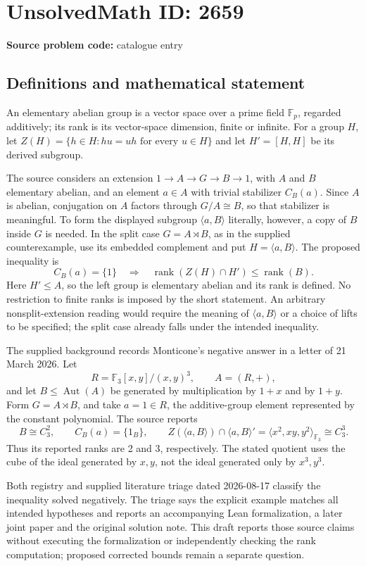 \documentclass[11pt]{article}
\newcommand{\F}{\mathbb{F}}
\begin{document}
\section*{UnsolvedMath ID: 2659}
\textbf{Source problem code:} catalogue entry
\subsection{Definitions and mathematical statement}
An elementary abelian group is a vector space over a prime field \(\F_p\), regarded additively; its rank is its vector-space dimension, finite or infinite. For a group \(H\), let \(Z(H)=\{h\in H:hu=uh\text{ for every }u\in H\}\) and let \(H'=[H,H]\) be its derived subgroup.

The source considers an extension \(1\to A\to G\to B\to1\), with \(A\) and \(B\) elementary abelian, and an element \(a\in A\) with trivial stabilizer \(C_B(a)\). Since \(A\) is abelian, conjugation on \(A\) factors through \(G/A\cong B\), so that stabilizer is meaningful. To form the displayed subgroup \(\langle a,B\rangle\) literally, however, a copy of \(B\) inside \(G\) is needed. In the split case \(G=A\rtimes B\), as in the supplied counterexample, use its embedded complement and put \(H=\langle a,B\rangle\). The proposed inequality is
\[
C_B(a)=\{1\}\quad\Longrightarrow\quad
\operatorname{rank}(Z(H)\cap H')\leq\operatorname{rank}(B).
\]
Here \(H'\leq A\), so the left group is elementary abelian and its rank is defined. No restriction to finite ranks is imposed by the short statement. An arbitrary nonsplit-extension reading would require the meaning of \(\langle a,B\rangle\) or a choice of lifts to be specified; the split case already falls under the intended inequality.

The supplied background records Monticone's negative answer in a letter of 21 March 2026. Let
\[
R=\F_3[x,y]/(x,y)^3,\qquad A=(R,+),
\]
and let \(B\leq\operatorname{Aut}(A)\) be generated by multiplication by \(1+x\) and by \(1+y\). Form \(G=A\rtimes B\), and take \(a=1\in R\), the additive-group element represented by the constant polynomial. The source reports
\[
B\cong C_3^2,\qquad C_B(a)=\{1_B\},\qquad
Z(\langle a,B\rangle)\cap\langle a,B\rangle'
=\langle x^2,xy,y^2\rangle_{\F_3}\cong C_3^3.
\]
Thus its reported ranks are 2 and 3, respectively. The stated quotient uses the cube of the ideal generated by \(x,y\), not the ideal generated only by \(x^3,y^3\).

Both registry and supplied literature triage dated 2026-08-17 classify the inequality solved negatively. The triage says the explicit example matches all intended hypotheses and reports an accompanying Lean formalization, a later joint paper and the original solution note. This draft reports those source claims without executing the formalization or independently checking the rank computation; proposed corrected bounds remain a separate question.
\end{document}
